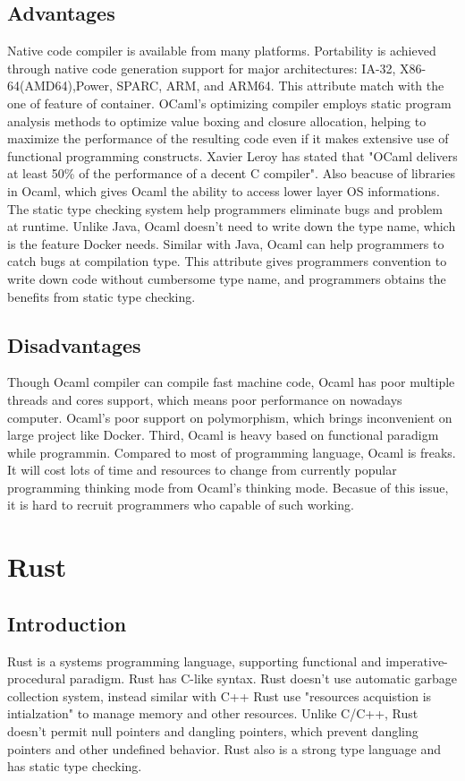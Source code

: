 \documentclass[10pt, a4paper]{IEEEtran}
\begin{document}
    \subsection*{Advantages}
    Native code compiler is available from many platforms. Portability is achieved through native code generation support for major architectures: IA-32, X86-64(AMD64),Power, SPARC, ARM, and ARM64.\cite{ocaml_2017} This attribute match with the one of feature of container. OCaml's optimizing compiler employs static program analysis methods to optimize value boxing and closure allocation, helping to maximize the performance of the resulting code even if it makes extensive use of functional programming constructs. Xavier Leroy has stated that "OCaml delivers at least 50\% of the performance of a decent C compiler".\cite{leroy} Also beacuse of  libraries in Ocaml, which gives Ocaml the ability to access lower layer OS informations. The static type checking system help programmers eliminate bugs and problem at runtime. Unlike Java, Ocaml doesn't need to write down the type name, which is the feature Docker needs. Similar with Java, Ocaml can help programmers to catch bugs at compilation type. This attribute gives programmers convention to write down code without cumbersome type name, and programmers obtains the benefits from static type checking.\\
    \subsection*{Disadvantages}
    Though Ocaml compiler can compile fast machine code, Ocaml has poor multiple threads and cores support, which means poor performance on nowadays computer. Ocaml's poor support on polymorphism, which brings inconvenient on large project like Docker. Third, Ocaml is heavy based on functional paradigm while programmin. Compared to most of programming language, Ocaml is freaks. It will cost lots of time and resources to change from currently popular programming thinking mode from Ocaml's thinking mode. Becasue of this issue, it is hard to recruit programmers who capable of such working.
    \section{Rust}
    \subsection*{Introduction}
    Rust is a systems programming language, supporting functional and imperative-procedural paradigm.\cite{the_rust} Rust has C-like syntax.
    Rust doesn't use automatic garbage collection system, instead similar with C++ Rust use "resources acquistion is intialzation" to manage memory and other resources. Unlike C/C++, Rust doesn't permit null pointers and dangling pointers, which prevent dangling pointers and other undefined behavior. Rust also is a strong type language and has static type checking.
\end{document}
